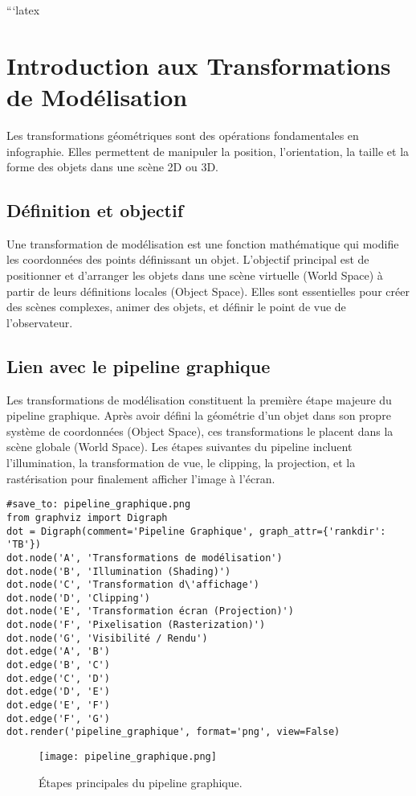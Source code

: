 ```latex

\sloppy
\section{Introduction aux Transformations de Modélisation}
Les transformations géométriques sont des opérations fondamentales en infographie. Elles permettent de manipuler la position, l'orientation, la taille et la forme des objets dans une scène 2D ou 3D.
\subsection{Définition et objectif}
Une transformation de modélisation est une fonction mathématique qui modifie les coordonnées des points définissant un objet. L'objectif principal est de positionner et d'arranger les objets dans une scène virtuelle (World Space) à partir de leurs définitions locales (Object Space). Elles sont essentielles pour créer des scènes complexes, animer des objets, et définir le point de vue de l'observateur.
\subsection{Lien avec le pipeline graphique}
Les transformations de modélisation constituent la première étape majeure du pipeline graphique. Après avoir défini la géométrie d'un objet dans son propre système de coordonnées (Object Space), ces transformations le placent dans la scène globale (World Space). Les étapes suivantes du pipeline incluent l'illumination, la transformation de vue, le clipping, la projection, et la rastérisation pour finalement afficher l'image à l'écran.
\begin{verbatim}
#save_to: pipeline_graphique.png
from graphviz import Digraph
dot = Digraph(comment='Pipeline Graphique', graph_attr={'rankdir': 'TB'})
dot.node('A', 'Transformations de modélisation')
dot.node('B', 'Illumination (Shading)')
dot.node('C', 'Transformation d\'affichage')
dot.node('D', 'Clipping')
dot.node('E', 'Transformation écran (Projection)')
dot.node('F', 'Pixelisation (Rasterization)')
dot.node('G', 'Visibilité / Rendu')
dot.edge('A', 'B')
dot.edge('B', 'C')
dot.edge('C', 'D')
dot.edge('D', 'E')
dot.edge('E', 'F')
dot.edge('F', 'G')
dot.render('pipeline_graphique', format='png', view=False)
\end{verbatim}
\begin{figure}[H]
\centering
\texttt{[image: pipeline\_graphique.png]}
\caption{Étapes principales du pipeline graphique.}
\label{fig:pipeline_graphique}
\end{figure}
